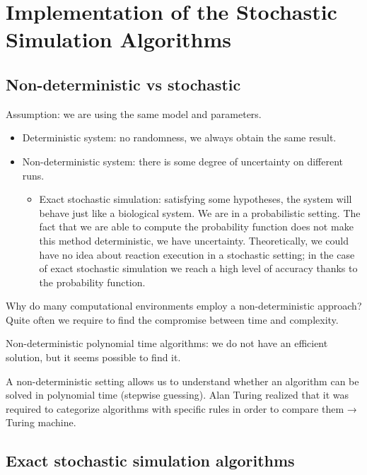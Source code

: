 \graphicspath{{chapters/03/}}
\chapter{Implementation of the Stochastic Simulation Algorithms}

\hypertarget{non-deterministic-vs-stochastic}{%
\section{Non-deterministic vs
stochastic}\label{non-deterministic-vs-stochastic}}

Assumption: we are using the same model and parameters.

\begin{itemize}
\tightlist
\item
  Deterministic system: no randomness, we always obtain the same result.
\item
  Non-deterministic system: there is some degree of uncertainty on
  different runs.

  \begin{itemize}
  \tightlist
  \item
    Exact stochastic simulation: satisfying some hypotheses, the system
    will behave just like a biological system. We are in a probabilistic
    setting. The fact that we are able to compute the probability
    function does not make this method deterministic, we have
    uncertainty. Theoretically, we could have no idea about reaction
    execution in a stochastic setting; in the case of exact stochastic
    simulation we reach a high level of accuracy thanks to the
    probability function.
  \end{itemize}
\end{itemize}

Why do many computational environments employ a non-deterministic
approach? Quite often we require to find the compromise between time and
complexity.

Non-deterministic polynomial time algorithms: we do not have an
efficient solution, but it seems possible to find it.

A non-deterministic setting allows us to understand whether an algorithm
can be solved in polynomial time (stepwise guessing). Alan Turing
realized that it was required to categorize algorithms with specific
rules in order to compare them → Turing machine.

\hypertarget{exact-stochastic-simulation-algorithms}{%
\section{Exact stochastic simulation
algorithms}\label{exact-stochastic-simulation-algorithms}}

